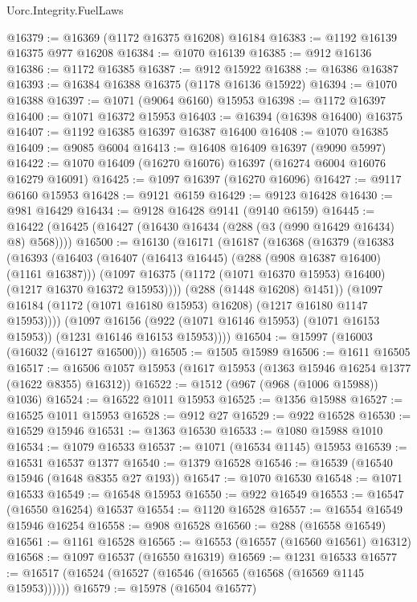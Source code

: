 \begin{lexlean}{Uorc.Integrity.FuelLaws}
\begin{coremodule}
@16379 := @16369 (@1172 @16375 @16208) @16184
@16383 := @1192 @16139 @16375 @977 @16208
@16384 := @1070 @16139
@16385 := @912 @16136
@16386 := @1172 @16385
@16387 := @912 @15922
@16388 := @16386 @16387
@16393 := @16384 @16388 @16375 (@1178 @16136 @15922)
@16394 := @1070 @16388
@16397 := @1071 (@9064 @6160) @15953
@16398 := @1172 @16397
@16400 := @1071 @16372 @15953
@16403 := @16394 (@16398 @16400) @16375
@16407 := @1192 @16385 @16397 @16387 @16400
@16408 := @1070 @16385
@16409 := @9085 @6004
@16413 := @16408 @16409 @16397 (@9090 @5997)
@16422 := @1070 @16409 (@16270 @16076) @16397 (@16274 @6004 @16076 @16279 @16091)
@16425 := @1097 @16397 (@16270 @16096)
@16427 := @9117 @6160 @15953
@16428 := @9121 @6159
@16429 := @9123 @16428
@16430 := @981 @16429
@16434 := @9128 @16428 @9141 (@9140 @6159)
@16445 := @16422 (@16425 (@16427 (@16430 @16434 (@288 (@3 (@990 @16429 @16434) @8) @568))))
@16500 := @16130
    (@16171
      (@16187
        (@16368
          (@16379
            (@16383
              (@16393
                (@16403
                  (@16407 (@16413 @16445) (@288 (@908 @16387 @16400) (@1161 @16387)))
                  (@1097 @16375 (@1172 (@1071 @16370 @15953) @16400) (@1217 @16370 @16372 @15953))))
              (@288 (@1448 @16208) @1451))
            (@1097 @16184 (@1172 (@1071 @16180 @15953) @16208) (@1217 @16180 @1147 @15953))))
        (@1097
          @16156
          (@922 (@1071 @16146 @15953) (@1071 @16153 @15953))
          (@1231 @16146 @16153 @15953))))
@16504 := @15997 (@16003 (@16032 (@16127 @16500)))
@16505 := @1505 @15989
@16506 := @1611 @16505
@16517 := @16506 @1057 @15953 (@1617 @15953 (@1363 @15946 @16254 @1377 (@1622 @8355) @16312))
@16522 := @1512 (@967 (@968 (@1006 @15988)) @1036)
@16524 := @16522 @1011 @15953
@16525 := @1356 @15988
@16527 := @16525 @1011 @15953
@16528 := @912 @27
@16529 := @922 @16528
@16530 := @16529 @15946
@16531 := @1363 @16530
@16533 := @1080 @15988 @1010
@16534 := @1079 @16533
@16537 := @1071 (@16534 @1145) @15953
@16539 := @16531 @16537 @1377
@16540 := @1379 @16528
@16546 := @16539 (@16540 @15946 (@1648 @8355 @27 @193))
@16547 := @1070 @16530
@16548 := @1071 @16533
@16549 := @16548 @15953
@16550 := @922 @16549
@16553 := @16547 (@16550 @16254) @16537
@16554 := @1120 @16528
@16557 := @16554 @16549 @15946 @16254
@16558 := @908 @16528
@16560 := @288 (@16558 @16549)
@16561 := @1161 @16528
@16565 := @16553 (@16557 (@16560 @16561) @16312)
@16568 := @1097 @16537 (@16550 @16319)
@16569 := @1231 @16533
@16577 := @16517 (@16524 (@16527 (@16546 (@16565 (@16568 (@16569 @1145 @15953))))))
@16579 := @15978 (@16504 @16577)

\end{coremodule}
\end{lexlean}
